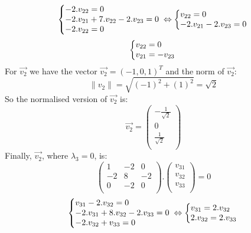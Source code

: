 \documentclass[600paper, 11pt,twoside,openany]{kdp}
\begin{document}
\[  \left\{\begin{array}{@{}l@{}}
   -2.v_{22} = 0\\
   -2.v_{21} + 7.v_{22}-2.v_{23} = 0\\
   -2.v_{22} = 0\\
  \end{array}\right.\,
   \Leftrightarrow
  \left\{\begin{array}{@{}l@{}}
   v_{22} = 0\\
  -2.v_{21} -2.v_{23} = 0\\
  \end{array}\right.\,
\]
\[  \left\{\begin{array}{@{}l@{}}
   v_{22} = 0\\
   v_{21} = -v_{23}\\
  \end{array}\right.\,
\]
\indent For $\overrightarrow{v_2}$ we have the vector $\overrightarrow{v_2} = (-1,0,1)^T$ and the norm of $\overrightarrow{v_2}$:
\[\| v_2 \| = \sqrt{(-1)^2  + (1)^2} = \sqrt{2}\]
\indent So the normalised version of $\overrightarrow{v_2}$ is: 
\[
\overrightarrow{v_2}  = \begin{pmatrix}
-\frac{1}{\sqrt{2}}\\
0\\
\frac{1}{\sqrt{2}}\\
\end{pmatrix}
\]
\indent Finally, $\overrightarrow{v_2}$, where $\lambda_3 = 0$, is:
\[
\begin{pmatrix}
1 & -2 & 0 \\
-2 & 8 & -2 \\
0 & -2 & 0 \\
\end{pmatrix}.
\begin{pmatrix}
v_{31}\\
v_{32}\\
v_{33} \\
\end{pmatrix} = 0 
\] 
\[
  \left\{\begin{array}{@{}l@{}}
   v_{31} -2.v_{32} = 0\\
   -2.v_{31} + 8.v_{32}-2.v_{33} = 0\\
   -2.v_{32} + v_{33}  = 0\\
  \end{array}\right.\,
   \Leftrightarrow
  \left\{\begin{array}{@{}l@{}}
   v_{31} = 2.v_{32}\\
   2.v_{32} =2.v_{33}\\
  \end{array}\right.\,
\]
\end{document}

